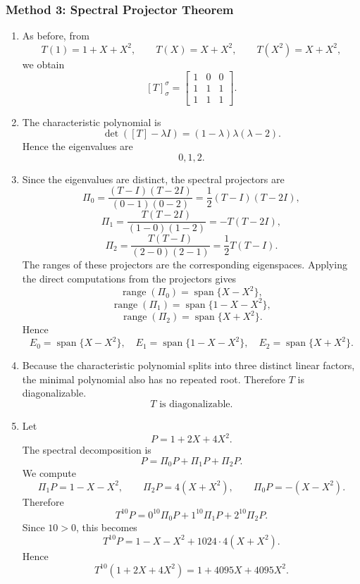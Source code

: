 \documentclass[12pt]{article}
\newcommand{\Span}{\operatorname{span}}
\newcommand{\Range}{\operatorname{range}}
\begin{document}
\newpage
\subsubsection{Method 3: Spectral Projector Theorem}
\begin{enumerate}[label=(\alph*)]
  \item As before, from
  \[
    T(1)=1+X+X^2,
    \qquad
    T(X)=X+X^2,
    \qquad
    T(X^2)=X+X^2,
  \]
  we obtain
  \[
    \boxed{[T]_{\sigma}^{\sigma}
    =
    \begin{bmatrix}
      1&0&0\\
      1&1&1\\
      1&1&1
    \end{bmatrix}.}
  \]

  \item The characteristic polynomial is
  \[
    \det([T]-\lambda I)=(1-\lambda)\lambda(\lambda-2).
  \]
  Hence the eigenvalues are
  \[
    \boxed{0,1,2.}
  \]

  \item Since the eigenvalues are distinct, the spectral projectors are
  \[
    \Pi_0=\frac{(T-I)(T-2I)}{(0-1)(0-2)}=\frac12(T-I)(T-2I),
  \]
  \[
    \Pi_1=\frac{T(T-2I)}{(1-0)(1-2)}=-T(T-2I),
  \]
  \[
    \Pi_2=\frac{T(T-I)}{(2-0)(2-1)}=\frac12T(T-I).
  \]
  The ranges of these projectors are the corresponding eigenspaces. Applying the direct computations from the projectors gives
  \[
    \Range(\Pi_0)=\Span\{X-X^2\},
  \]
  \[
    \Range(\Pi_1)=\Span\{1-X-X^2\},
  \]
  \[
    \Range(\Pi_2)=\Span\{X+X^2\}.
  \]
  Hence
  \[
    \boxed{
    E_0=\Span\{X-X^2\},\quad
    E_1=\Span\{1-X-X^2\},\quad
    E_2=\Span\{X+X^2\}.}
  \]

  \item Because the characteristic polynomial splits into three distinct linear factors, the minimal polynomial also has no repeated root. Therefore $T$ is diagonalizable.
  \[
    \boxed{T\text{ is diagonalizable}.}
  \]

  \item Let
  \[
    P=1+2X+4X^2.
  \]
  The spectral decomposition is
  \[
    P=\Pi_0P+\Pi_1P+\Pi_2P.
  \]
  We compute
  \[
    \Pi_1P=1-X-X^2,
    \qquad
    \Pi_2P=4(X+X^2),
    \qquad
    \Pi_0P=-(X-X^2).
  \]
  Therefore
  \[
    T^{10}P=0^{10}\Pi_0P+1^{10}\Pi_1P+2^{10}\Pi_2P.
  \]
  Since $10>0$, this becomes
  \[
    T^{10}P=1-X-X^2+1024\cdot 4(X+X^2).
  \]
  Hence
  \[
    \boxed{T^{10}(1+2X+4X^2)=1+4095X+4095X^2.}
  \]
\end{enumerate}
\end{document}
